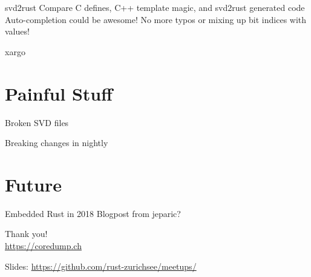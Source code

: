 \documentclass[aspectratio=1610,14pt,t]{beamer}
\begin{document}
\begin{frame}[c]{svd2rust}
  Compare C defines, C++ template magic, and svd2rust generated code
  Auto-completion could be awesome!
  No more typos or mixing up bit indices with values!
\end{frame}

\begin{frame}[c]{xargo}
\end{frame}

\section{Painful Stuff}

\begin{frame}[c]{Broken SVD files}
\end{frame}

\begin{frame}[c]{Breaking changes in nightly}
\end{frame}

\section{Future}

\begin{frame}[c]{Embedded Rust in 2018}
  Blogpost from jeparic?
\end{frame}


{
\begin{frame}[standout]
  \begin{centering}
    {\Huge Thank you!}\\
    {\normalsize \url{https://coredump.ch}}\\
  \end{centering}
  {\small Slides: \url{https://github.com/rust-zurichsee/meetups/}}\\
  \vspace{3cm}
\end{frame}
}
\end{document}
